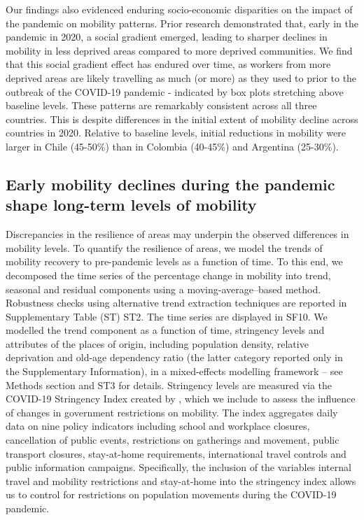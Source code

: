 \documentclass[fleqn,10pt]{wlscirep}
\begin{document}
Our findings also evidenced enduring socio-economic disparities on the impact of the pandemic on mobility patterns. Prior research demonstrated that, early in the pandemic in 2020, a social gradient emerged, leading to sharper declines in mobility in less deprived areas compared to more deprived communities. We find that this social gradient effect has endured over time, as workers from more deprived areas are likely travelling as much (or more) as they used to prior to the outbreak of the COVID-19 pandemic - indicated by box plots stretching above baseline levels. These patterns are remarkably consistent across all three countries. This is despite differences in the initial extent of mobility decline across countries in 2020. Relative to baseline levels, initial reductions in mobility were larger in Chile (45-50\%) than in Colombia (40-45\%) and Argentina (25-30\%).


\subsection*{Early mobility declines during the pandemic shape long-term levels of mobility}

Discrepancies in the resilience of areas may underpin the observed differences in mobility levels. To quantify the resilience of areas, we model the trends of mobility recovery to pre-pandemic levels as a function of time. To this end, we decomposed the time series of the percentage change in mobility into trend, seasonal and residual components using a moving-average–based method. Robustness checks using alternative trend extraction techniques are reported in Supplementary Table (ST) ST2. The time series are displayed in SF10. We modelled the trend component as a function of time, stringency levels and attributes of the places of origin, including population density, relative deprivation and old-age dependency ratio (the latter category reported only in the Supplementary Information), in a mixed-effects modelling framework – see Methods section and ST3 for details.  Stringency levels are measured via the COVID-19 Stringency Index created by \cite{hale2021global}, which we include to assess the influence of changes in government restrictions on mobility. The index aggregates daily data on nine policy indicators including school and workplace closures, cancellation of public events, restrictions on gatherings and movement, public transport closures, stay-at-home requirements, international travel controls and public information campaigns. Specifically, the inclusion of the variables internal travel and mobility restrictions and stay-at-home into the stringency index allows us to control for restrictions on population movements during the COVID-19 pandemic.
\end{document}
